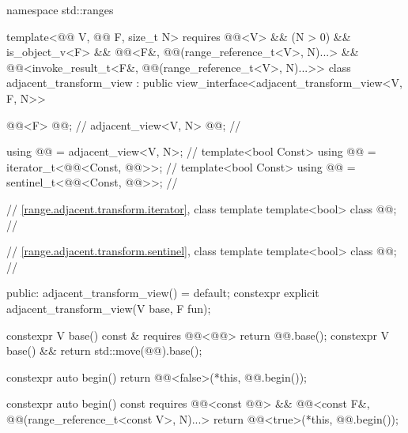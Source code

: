 %
%
%
\begin{codeblock}
namespace std::ranges {
  template<@@ V, @@ F, size_t N>
    requires @@<V> && (N > 0) && is_object_v<F> &&
             @@<F&, @@(range_reference_t<V>, N)...> &&
             @@<invoke_result_t<F&, @@(range_reference_t<V>, N)...>>
  class adjacent_transform_view : public view_interface<adjacent_transform_view<V, F, N>> {
    @@<F> @@;                        // \expos
    adjacent_view<V, N> @@;                 // \expos

    using @@ = adjacent_view<V, N>;      // \expos
    template<bool Const>
      using @@ = iterator_t<@@<Const, @@>>;         // \expos
    template<bool Const>
      using @@ = sentinel_t<@@<Const, @@>>;         // \expos

    // \ref{range.adjacent.transform.iterator}, class template 
    template<bool> class @@;              // \expos

    // \ref{range.adjacent.transform.sentinel}, class template 
    template<bool> class @@;              // \expos

  public:
    adjacent_transform_view() = default;
    constexpr explicit adjacent_transform_view(V base, F fun);

    constexpr V base() const & requires @@<@@> { return @@.base(); }
    constexpr V base() && { return std::move(@@).base(); }

    constexpr auto begin() {
      return @@<false>(*this, @@.begin());
    }

    constexpr auto begin() const
      requires @@<const @@> &&
               @@<const F&, @@(range_reference_t<const V>, N)...> {
      return @@<true>(*this, @@.begin());
    }

}}
\end{codeblock}
